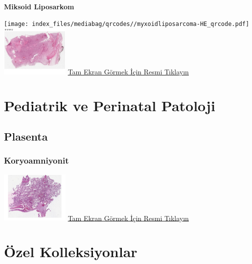 \documentclass[
  letterpaper,
  DIV=11,
  numbers=noendperiod]{scrreprt}
\begin{document}
\textbf{Miksoid Liposarkom}

\texttt{[image: index\_files/mediabag/qrcodes//myxoidliposarcoma-HE\_qrcode.pdf]}
\href{https://images.patolojiatlasi.com/myxoidliposarcoma/HE.html}{\includegraphics[width=0.25\textwidth,height=\textheight]{./screenshots/thumbnail_myxoidliposarcoma.png}}
\href{https://images.patolojiatlasi.com/myxoidliposarcoma/HE.html}{Tam
Ekran Görmek İçin Resmi Tıklayın}

\hypertarget{section}{%
\chapter{}\label{section}}

\part{Pediatrik ve Perinatal Patoloji}

\hypertarget{sec-plasenta}{%
\chapter{Plasenta}\label{sec-plasenta}}

\hypertarget{sec-koryoamniyonit}{%
\section{Koryoamniyonit}\label{sec-koryoamniyonit}}

\href{https://images.patolojiatlasi.com/chorioamnionitis/HE.html}{\includegraphics[width=0.25\textwidth,height=\textheight]{./screenshots/thumbnail_chorioamnionitis.png}}
\href{https://images.patolojiatlasi.com/chorioamnionitis/HE.html}{Tam
Ekran Görmek İçin Resmi Tıklayın}

\part{Özel Kolleksiyonlar}
\end{document}
